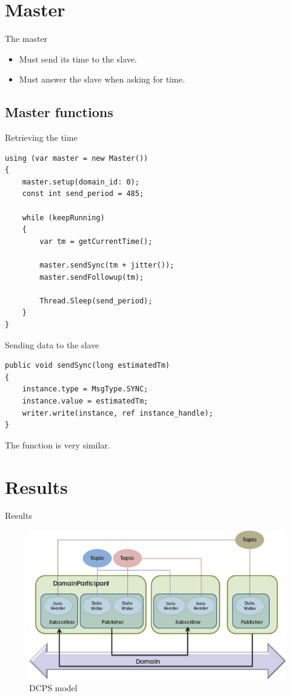 \documentclass[compressed, presentation, notheorems, 12pt]{beamer}
\begin{document}
\section{Master}

	\begin{frame}{The master}
	\begin{itemize}
		\item Must send its time to the slave.
		\item Must answer the slave when asking for time.
	\end{itemize}
	\end{frame}


\subsection{Master functions}
	\begin{frame}[containsverbatim]{Retrieving the time}
	\begin{lstlisting}[style=Code-C++]
using (var master = new Master())
{
	master.setup(domain_id: 0);
	const int send_period = 485; 

	while (keepRunning)
	{
		var tm = getCurrentTime();

		master.sendSync(tm + jitter());
		master.sendFollowup(tm);						

		Thread.Sleep(send_period);
	}
}
	\end{lstlisting}
	\end{frame}

 	

	\begin{frame}[containsverbatim]{Sending data to the slave}
	\begin{lstlisting}[style=Code-C++]
public void sendSync(long estimatedTm)
{
	instance.type = MsgType.SYNC;
	instance.value = estimatedTm;
	writer.write(instance, ref instance_handle);
}
	\end{lstlisting}

	The function  is very similar.
	\end{frame}



\section{Results}
\begin{frame}{Results}

\begin{figure}[hbtp]
\centering
\includegraphics[width =0.9 \textwidth]{RTI_EntityOverview_small}
\caption{DCPS model}
\label{fig:referenceNavn}
\end{figure}


\end{frame}
\end{document}
